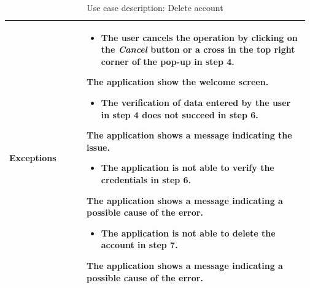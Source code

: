 \begin{table}[H]
\begin{tabular}{@{}p{0.25\linewidth} p{0.72\linewidth}@{}}
		\textbf{Exceptions}         & \begin{itemize}[leftmargin=.4cm,noitemsep,topsep=0pt,before=\vspace{-3mm}]
		   \item The user cancels the operation by clicking on the \textit{Cancel} button or a cross in the top right corner of the pop-up in step 4.
		\end{itemize}
		The application show the welcome screen.
	    \begin{itemize}[leftmargin=.4cm,noitemsep,topsep=0pt]
		   \item The verification of data entered by the user in step 4 does not succeed in step 6.
		\end{itemize}
		The application shows a message indicating the issue.
	    \begin{itemize}[leftmargin=.4cm,noitemsep,topsep=0pt]
		   \item The application is not able to verify the credentials in step 6.
		\end{itemize}
		The application shows a message indicating a possible cause of the error.
	    \begin{itemize}[leftmargin=.4cm,noitemsep,topsep=0pt]
		   \item The application is not able to delete the account in step 7.
		\end{itemize}
		The application shows a message indicating a possible cause of the error.
		\\\bottomrule
	\end{tabular}
	\caption{Use case description: Delete account} 
\end{table}

